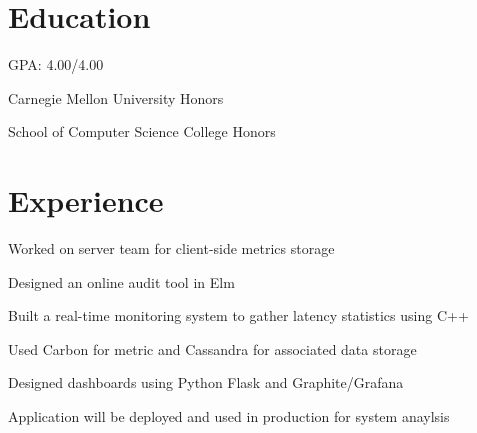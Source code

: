 \documentclass[letterpaper]{deedy-resume} %
\begin{document}
\begin{minipage}[t]{0.66\textwidth} %


\section{Education} 


\vspace{\topsep} %
\begin{tightitemize}
	\item GPA: 4.00/4.00
  \item Carnegie Mellon University Honors
  \item School of Computer Science College Honors
\end{tightitemize}

\sectionspace %



\section{Experience}


\begin{tightitemize}
\item Worked on server team for client-side metrics storage
\item Designed an online audit tool in Elm
\end{tightitemize}

\sectionspace %



\begin{tightitemize}
\item Built a real-time monitoring system to gather latency statistics using C++
\item Used Carbon for metric and Cassandra for associated data storage
\item Designed dashboards using Python Flask and Graphite/Grafana
\item Application will be deployed and used in production for system anaylsis
\end{tightitemize}


\end{minipage}
\end{document}
